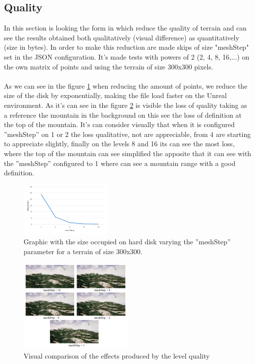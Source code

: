 \documentclass[10pt,a4paper,twocolumn,twoside]{article}
\begin{document}
\subsection{Quality}
\label{qualitat}
In this section is looking the form in which reduce the quality of terrain and can see the results obtained both qualitatively (visual difference) as quantitatively (size in bytes). In order to make this reduction are made skips of size "meshStep" set in the JSON configuration. It's made tests with powers of 2 (2, 4, 8, 16,...) on the own matrix of points and using the terrain of size 300x300 pixels.
\\
\\
As we can see in the figure \ref{fig-qualitatmegas} when reducing the amount of points, we reduce the size of the disk by exponentially, making the file load faster on the Unreal environment. As it's can see in the figure \ref{fig-qualityvisual} is visible the loss of quality taking as a reference the mountain in the background on this see the loss of definition at the top of the mountain. It's can consider visually that when it is configured ''meshStep'' on 1 or 2 the loss qualitative, not are appreciable, from 4 are starting to appreciate slightly, finally on the levels 8 and 16 its can see the most loss, where the top of the mountain can see simplified the apposite that it can see with the ''meshStep'' configured to 1 where can see a mountain range with a good definition.

\begin{figure}[!h]
\centering
  	\includegraphics[width=0.4\textwidth]{qualitatmegas}
	\caption{Graphic with the size occupied on hard disk varying the ''meshStep'' parameter for a terrain of size 300x300.}
	\label{fig-qualitatmegas}
\end{figure}

\begin{figure}[!h]
\centering
  	\includegraphics[width=0.5\textwidth]{quality/quality}
	\caption{Visual comparison of the effects produced by the level quality}
	\label{fig-qualityvisual}
\end{figure}
\end{document}
